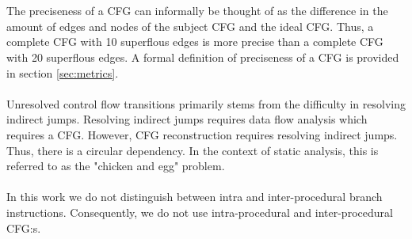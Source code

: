 \documentclass{kththesis}
\begin{document}
\\ \\
The preciseness of a CFG can informally be thought of as the difference in the amount of edges and nodes of the subject CFG and the ideal CFG. Thus, a complete CFG with 10 superflous edges is more precise than a complete CFG with 20 superflous edges. A formal definition of preciseness of a CFG is provided in section \ref{sec:metrics}.
\\ \\
Unresolved control flow transitions primarily stems from the difficulty in resolving indirect jumps. Resolving indirect jumps requires data flow analysis which requires a CFG. However, CFG reconstruction requires resolving indirect jumps. Thus, there is a circular dependency. In the context of static analysis, this is referred to as the "chicken and egg" problem\cite{Jakstab}.
\\ \\
In this work we do not distinguish between intra and inter-procedural branch instructions. Consequently, we do not use intra-procedural and inter-procedural CFG:s.

%
%
%
\end{document}
